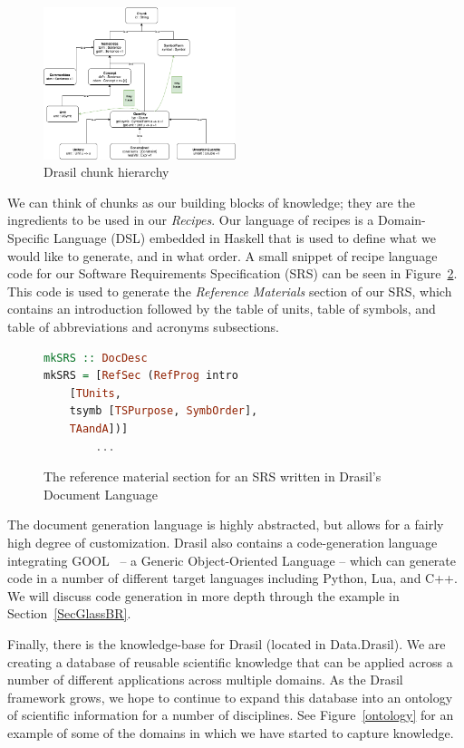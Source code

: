 \documentclass[sigconf]{acmart}
\begin{document}
\begin{figure}
	\centering
	\includegraphics[width=0.5\textwidth]{figures/class_hierarchy.png}
	\caption{Drasil chunk hierarchy}
	\label{hierarchy}
\end{figure}

We can think of chunks as our building blocks of knowledge; they are the 
ingredients to be used in our \textit{Recipes}. Our language of recipes is a 
Domain-Specific Language (DSL) embedded in Haskell that is used to define what 
we would like to generate, and in what order. A small snippet of recipe 
language code for our Software Requirements Specification (SRS) can be seen in 
Figure~\ref{recipeLang}. This code is used to generate the \textit{Reference 
Materials} section of our SRS, which contains an introduction followed by the 
table of units, table of symbols, and table of abbreviations and acronyms 
subsections.

\begin{figure}
\begin{lstlisting}[language=Haskell, frame=single, showstringspaces=false, 
basicstyle=\small]
mkSRS :: DocDesc 
mkSRS = [RefSec (RefProg intro 
	[TUnits, 
	tsymb [TSPurpose, SymbOrder], 
	TAandA])]
        ...
\end{lstlisting}
\caption{The reference material section for an SRS written in Drasil's Document 
Language}
\label{recipeLang}
\end{figure}

The document generation language is highly abstracted, but allows for a fairly
high degree of customization. Drasil also contains a code-generation language
integrating GOOL~\cite{Costabile2012} -- a Generic Object-Oriented Language -- which can
generate code in a number of different target languages including Python, Lua,
and C++.  We will discuss code generation in more depth through the example in
Section~\ref{SecGlassBR}.

Finally, there is the knowledge-base for Drasil (located in Data.Drasil). We 
are creating a database of reusable scientific knowledge that can be applied 
across a number of different applications across multiple domains. As the 
Drasil framework grows, we hope to continue to expand this database into an 
ontology of scientific information for a number of disciplines. See 
Figure~\ref{ontology} for an example of some of the domains in which we have 
started to capture knowledge.
\end{document}
